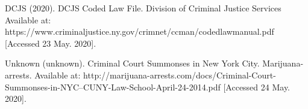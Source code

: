 \documentclass{article}\usepackage[]{graphicx}\usepackage[]{color}
\begin{document}
        DCJS (2020). DCJS Coded Law File. Division of Criminal Justice Services
        Available at: 
        https://www.criminaljustice.ny.gov/crimnet/ccman/codedlawmanual.pdf
        [Accessed 23 May. 2020].\vspace{5mm}
        
        Unknown (unknown). Criminal Court Summonses in New York City. Marijuana-arrests. 
        Available at:
        http://marijuana-arrests.com/docs/Criminal-Court-Summonses-in-NYC--CUNY-Law-School-April-24-2014.pdf
        [Accessed 24 May. 2020].\vspace{5mm}
\end{document}
